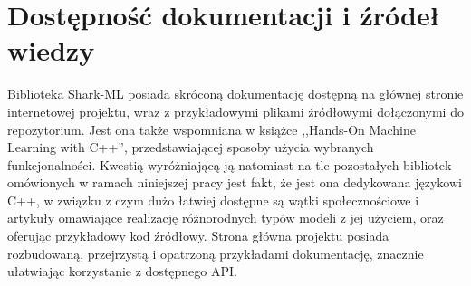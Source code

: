 
\section{Dostępność dokumentacji i źródeł wiedzy}

Biblioteka Shark-ML posiada skróconą dokumentację dostępną na głównej stronie internetowej projektu, wraz z przykładowymi plikami źródłowymi dołączonymi do repozytorium. Jest ona także wspomniana w książce ,,Hands-On Machine Learning with C++'', przedstawiającej sposoby użycia wybranych funkcjonalności. Kwestią wyróżniającą ją natomiast na tle pozostałych bibliotek omówionych w ramach niniejszej pracy jest fakt, że jest ona dedykowana językowi C++, w związku z czym dużo łatwiej dostępne są wątki społecznościowe i artykuły omawiające realizację różnorodnych typów modeli z jej użyciem, oraz oferując przykładowy kod źródłowy. Strona główna projektu \cite{shark:home} posiada rozbudowaną, przejrzystą i opatrzoną przykładami dokumentację, znacznie ułatwiając korzystanie z dostępnego API.